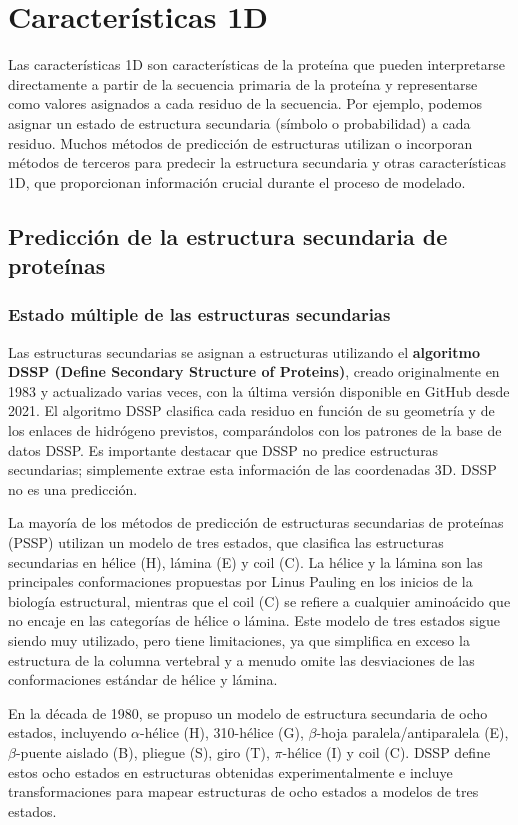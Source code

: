 \chapter{Características 1D}
Las características 1D son características de la proteína que pueden interpretarse directamente a partir de la secuencia primaria de la proteína y representarse como valores asignados a cada residuo de la secuencia. Por ejemplo, podemos asignar un estado de estructura secundaria (símbolo o probabilidad) a cada residuo. Muchos métodos de predicción de estructuras utilizan o incorporan métodos de terceros para predecir la estructura secundaria y otras características 1D, que proporcionan información crucial durante el proceso de modelado.

\section{Predicción de la estructura secundaria de proteínas}
\subsection{Estado múltiple de las estructuras secundarias}
Las estructuras secundarias se asignan a estructuras utilizando el \textbf{algoritmo DSSP (Define Secondary Structure of Proteins)}, creado originalmente en 1983 y actualizado varias veces, con la última versión disponible en GitHub desde 2021. El algoritmo DSSP clasifica cada residuo en función de su geometría y de los enlaces de hidrógeno previstos, comparándolos con los patrones de la base de datos DSSP. Es importante destacar que DSSP no predice estructuras secundarias; simplemente extrae esta información de las coordenadas 3D. DSSP no es una predicción.

La mayoría de los métodos de predicción de estructuras secundarias de proteínas (PSSP) utilizan un modelo de tres estados, que clasifica las estructuras secundarias en hélice (H), lámina (E) y coil (C). La hélice y la lámina son las principales conformaciones propuestas por Linus Pauling en los inicios de la biología estructural, mientras que el coil (C) se refiere a cualquier aminoácido que no encaje en las categorías de hélice o lámina. Este modelo de tres estados sigue siendo muy utilizado, pero tiene limitaciones, ya que simplifica en exceso la estructura de la columna vertebral y a menudo omite las desviaciones de las conformaciones estándar de hélice y lámina.

En la década de 1980, se propuso un modelo de estructura secundaria de ocho estados, incluyendo $\alpha$-hélice (H), 310-hélice (G), $\beta$-hoja paralela/antiparalela (E), $\beta$-puente aislado (B), pliegue (S), giro (T), $\pi$-hélice (I) y coil (C). DSSP define estos ocho estados en estructuras obtenidas experimentalmente e incluye transformaciones para mapear estructuras de ocho estados a modelos de tres estados.


